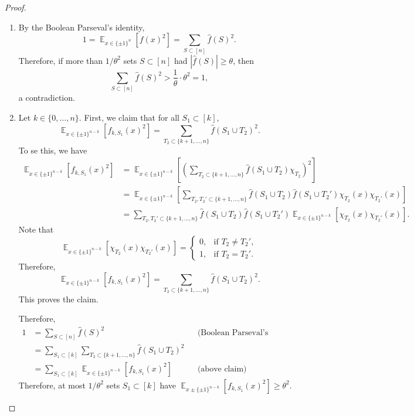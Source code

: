 \documentclass[letterpaper, reqno,11pt]{article}
\newcommand{\EE}{\mathop{{}\mathbb{E}}}
\begin{document}
\begin{proof}
  \begin{enumerate}[label=(\roman*)]
    \item By the Boolean Parseval's identity,
    $$ 1 = \EE_{x \in \{ \pm 1 \}^n}\left[f(x)^2\right] = \sum_{S \subset [n]} \hat{f}(S)^2. $$
    Therefore, if more than $1/\theta^2$ sets $S \subset [n]$ had $|\hat{f}(S)| \geq \theta$, then
    $$ \sum_{S \subset [n]} \hat{f}(S)^2 > \frac{1}{\theta} \cdot \theta^2 = 1, $$
    a contradiction.
    \item Let $k \in \{ 0, \ldots, n \}$. First, we claim that for all $S_1 \subset [k]$,
    $$ \EE_{x \in \{ \pm 1 \}^{n - k}} \left[f_{k, S_1}(x)^2\right] = \sum_{T_2 \subset \{ k + 1, \ldots, n \}} \hat{f}\left(S_1 \cup T_2\right)^2. $$
    To se this, we have
    \begin{align*}
      \EE_{x \in \{ \pm 1 \}^{n - k}} \left[f_{k, S_1}(x)^2\right] &= \EE_{x \in \{ \pm 1 \}^{n - k}}\left[\left(\sum_{T_2 \subset \{ k + 1, \ldots, n \}} \hat{f}\left(S_1 \cup T_2\right) \chi_{T_2}\right)^2\right] \\
      &= \EE_{x \in \{ \pm 1 \}^{n - k}}\left[\sum_{T_2, T_2' \subset \{ k + 1, \ldots, n \}} \hat{f}\left(S_1 \cup T_2\right) \hat{f}\left(S_1 \cup T_2'\right) \chi_{T_2}(x) \chi_{T_2'}(x)\right] \\
      &= \sum_{T_2, T_2' \subset \{ k + 1, \ldots, n \}} \hat{f}\left(S_1 \cup T_2\right) \hat{f}\left(S_1 \cup T_2'\right) \EE_{x \in \{ \pm 1 \}^{n - k}}\left[\chi_{T_2}(x) \chi_{T_2'}(x)\right].
    \end{align*}
    Note that
    $$ \EE_{x \in \{ \pm 1 \}^{n - k}}\left[\chi_{T_2}(x) \chi_{T_2'}(x)\right] = \left\{
      \begin{array}{ll}
        0, & \text{if $T_2 \neq T_2'$}, \\
        1, & \text{if $T_2 = T_2'$}.
      \end{array}
    \right. $$
    Therefore,
    $$ \EE_{x \in \{ \pm 1 \}^{n - k}} \left[f_{k, S_1}(x)^2\right] = \sum_{T_2 \subset \{ k + 1, \ldots, n \}} \hat{f}\left(S_1 \cup T_2\right)^2. $$
    This proves the claim.

    Therefore,
    \begin{align*}
      1 &= \sum_{S \subset [n]} \hat{f}(S)^2 && \text{(Boolean Parseval's identity)} \\
      &= \sum_{S_1 \subset [k]} \sum_{T_2 \subset \{ k + 1, \ldots, n \}} \hat{f}\left(S_1 \cup T_2\right)^2 \\
      &= \sum_{S_1 \subset [k]} \EE_{x \in \{ \pm 1 \}^{n - k}}\left[f_{k, S_1}(x)^2\right] && \text{(above claim)}
    \end{align*}
    Therefore, at most $1/\theta^2$ sets $S_1 \subset [k]$ have $\EE_{x \pm \{ \pm 1 \}^{n - k}}[f_{k, S_1}(x)^2] \geq \theta^2$.
  \end{enumerate}
\end{proof}
\end{document}
